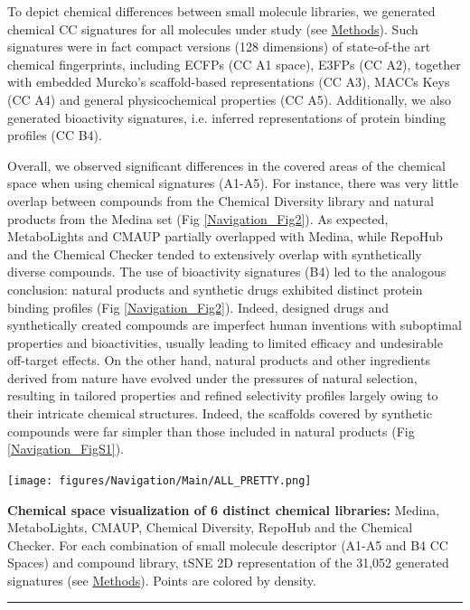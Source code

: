 To depict chemical differences between small molecule libraries, we generated chemical CC signatures for all molecules under study (see \hyperref[Navigation_Methods]{Methods}). Such signatures were in fact compact versions (128 dimensions) of state-of-the art chemical fingerprints, including ECFPs (CC A1 space), E3FPs (CC A2), together with embedded Murcko’s scaffold-based representations (CC A3), MACCs Keys (CC A4) and general physicochemical properties (CC A5). Additionally, we also generated bioactivity signatures, i.e. inferred representations of protein binding profiles (CC B4). 

Overall, we observed significant differences in the covered areas of the chemical space when using chemical signatures (A1-A5). For instance, there was very little overlap between compounds from the Chemical Diversity library and natural products from the Medina set (Fig \ref{Navigation_Fig2}). As expected, MetaboLights and CMAUP partially overlapped with Medina, while RepoHub and the Chemical Checker tended to extensively overlap with synthetically diverse compounds. The use of bioactivity signatures (B4) led to the analogous conclusion: natural products and synthetic drugs exhibited distinct protein binding profiles (Fig \ref{Navigation_Fig2}). Indeed, designed drugs and synthetically created compounds are imperfect human inventions with suboptimal properties and bioactivities, usually leading to limited efficacy and undesirable off-target effects. On the other hand, natural products and other ingredients derived from nature have evolved under the pressures of natural selection, resulting in tailored properties and refined selectivity profiles largely owing to their intricate chemical structures. Indeed, the scaffolds covered by synthetic compounds were far simpler than those included in natural products (Fig \ref{Navigation_FigS1}). 




\begin{Figure_modified}
  \centering
  \texttt{[image: figures/Navigation/Main/ALL\_PRETTY.png]}
  \caption{\textbf{Chemical space visualization of 6 distinct chemical libraries:} Medina, MetaboLights\cite{yurekten_metabolights_2024, haug_metabolights_2019}, CMAUP\cite{hou_cmaup_2024, zeng_cmaup_2019}, Chemical Diversity, RepoHub\cite{corsello_drug_2017} and the Chemical Checker\cite{duran-frigola_extending_2020}. For each combination of small molecule descriptor (A1-A5 and B4 CC Spaces) and compound library, tSNE 2D representation of the 31,052 generated signatures (see \hyperref[Navigation_Methods]{Methods}). Points are colored by density.
}
  \vspace{-5mm}
  \rule[0ex]{\textwidth}{0.5pt}
  \vspace{-9mm}
  \label{Navigation_Fig2}
\end{Figure_modified}


